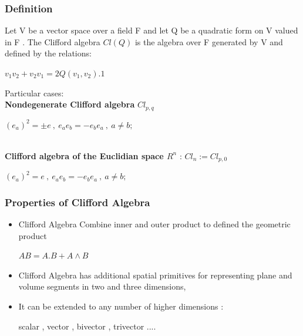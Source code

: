 \label{definition}
\begin{frame}\frametitle{Definition}
  \begin{definition}
 Let V be a vector space over a field F and let Q be a quadratic form on V
valued in F . The Clifford algebra $Cl(Q)$ is the algebra over F generated by V and defined
by the relations:
\begin{center}
$v_{1} v_{2} + v_{2}v_{1} = 2Q(v_{1} , v_{2} ) . 1$
 
\end{center}

  \end{definition}
  
  
 Particular cases:
 \\
\textbf{Nondegenerate Clifford algebra} $Cl_{p,q}$
\begin{center}
	 $(e_a)^2 = \pm e\: ,\:  e_a e_b = − e_b e_a \: ,\:  a \neq b;$
\end{center}
 \\
 \textbf{Clifford algebra of the Euclidian space $R^n$} : $Cl_n :=Cl_{p,0}$
\begin{center}
	 $(e_a )^2 = e\: ,\:  e_a e_b = −e_b e_a \: ,\:  a \neq b;$
\end{center}
  
 \end{frame} 
 
  
  
  
\begin{frame}\frametitle{Properties of Clifford Algebra} 
\begin{itemize}
	\item 

 Clifford Algebra Combine inner and outer product to defined the geometric product \\
\begin{center}
	$AB = A.B + A \wedge B$
\end{center}
	\item 
 Clifford Algebra has additional spatial primitives for representing plane and volume segments in two and three dimensions, %
 	\item 
 It can be extended to any number of higher dimensions :
  
\begin{center}
	scalar , vector , bivector , trivector ....
\end{center}
  
  \end{itemize} 
\end{frame}
  
